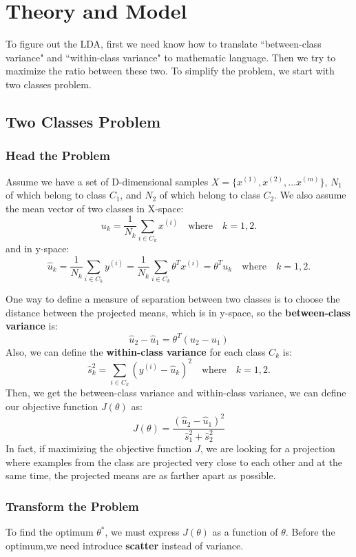 \documentclass[a4paper]{article}
\begin{document}
\section{Theory and Model}

To figure out the LDA, first we need know how to translate ``between-class variance" and ``within-class variance" to mathematic language. Then we try to maximize the ratio between these two. To simplify the problem, we start with two classes problem.

\subsection{Two Classes Problem}
\subsubsection{Head the Problem}
Assume we have a set of D-dimensional samples $X = \{x^{(1)}, x^{(2)}, ... x^{(m)} \}$, $N_1$ of which belong to class $C_1$, and $N_2$ of which belong to class $C_2$.
We also assume the mean vector of two classes in X-space:
$$
	u_k = \frac{1}{N_k} \sum_{i \in C_k} x ^{(i)} \quad \textrm{where}  \quad k = 1, 2.
$$
and in y-space:
$$
	{\hat{u}}_k = \frac{1}{N_k} \sum_{i \in C_k} y^{(i)} = \frac{1}{N_k} \sum_{i \in C_k} \theta^{T}x^{(i)} = \theta^{T}u_k \quad \textrm{where} \quad k = 1, 2.
$$

One way to define a measure of separation between two classes is to choose the distance between the projected means, which is in y-space, so the \textbf{between-class variance} is:
$$
	\hat{u}_2 - \hat{u}_1 =  \theta^{T}(u_2 - u_1)
$$
Also, we can define the \textbf{within-class variance} for each class $C_k$ is:
$$
	\hat{s}^{2}_k = \sum_{i \in C_k} (y^{(i)}-\hat{u}_k)^2 \quad \textrm{where} \quad k = 1,2.
$$
Then, we get the between-class variance and within-class variance, we can define our objective function $J(\theta)$ as:
$$
	J(\theta) = \frac{(\hat{u}_2 -\hat{u}_1)^2} {\hat{s}^{2}_1 + \hat{s}^{2}_2}
$$
In fact, if maximizing the objective function $J$, we are looking for a projection where examples from the class are projected very close to each other and at the same time, the projected means are as farther apart as possible. 

\subsubsection{Transform the Problem}
To find the optimum $\theta^\ast$, we must express $J(\theta)$ as a function of $\theta$. Before the optimum,we need introduce \textbf{scatter} instead of variance. 
\end{document}
